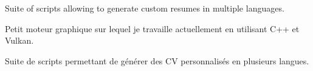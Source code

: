 \documentclass[10pt,a4paper,ragged2e,withhyper]{altacv}
\begin{document}
\begin{paracol}{2}
                Suite of scripts allowing to generate custom resumes in multiple languages.\\
                \medskip

                Petit moteur graphique sur lequel je travaille actuellement en utilisant C++ et Vulkan.\\
                \medskip
            \divider
            
                Suite de scripts permettant de générer des CV personnalisés en plusieurs langues.\\
                \medskip
    \end{paracol}
\end{document}
